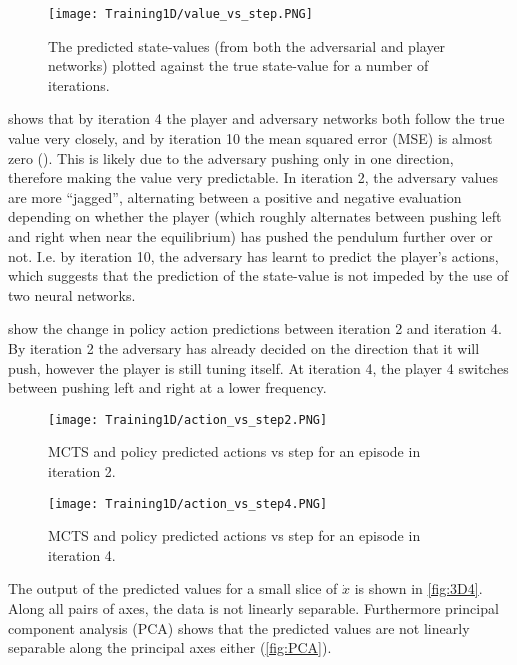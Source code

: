 \documentclass[../main.tex]{subfiles}
\begin{document}
\begin{figure}[H]
    \centering
    \texttt{[image: Training1D/value\_vs\_step.PNG]}
    \caption{The predicted state-values (from both the adversarial and player networks) plotted against the true state-value for a number of iterations.}
    \label{fig:value}
\end{figure}

 shows that by iteration 4 the player and adversary networks both follow the true value very closely, and by  iteration 10 the mean squared error (MSE) is almost zero (). This is likely due to the adversary pushing only in one direction, therefore making the value very predictable. In iteration 2, the adversary values are more ``jagged'', alternating between a positive and negative evaluation depending on whether the player (which roughly alternates between pushing left and right when near the equilibrium) has pushed the pendulum further over or not. I.e. by iteration 10, the adversary has learnt to predict the player's actions, which suggests that the prediction of the state-value is not impeded by the use of two neural networks.

 show the change in policy action predictions between iteration 2 and iteration 4. By iteration 2 the adversary has already decided on the direction that it will push, however the player is still tuning itself. At iteration 4, the player 4 switches between pushing left and right at a lower frequency.

\begin{figure}[h]
    \centering
    \texttt{[image: Training1D/action\_vs\_step2.PNG]}
    \caption{MCTS and policy predicted actions vs step for an episode in iteration 2.}
    \label{fig:action2}
\end{figure}
\begin{figure}[h]
    \centering
    \texttt{[image: Training1D/action\_vs\_step4.PNG]}
    \caption{MCTS and policy predicted actions vs step for an episode in iteration 4.}
    \label{fig:action4}
\end{figure}

The output of the predicted values for a small slice of $\dot{x}$ is shown in \cref{fig:3D4}. Along all pairs of axes, the data is not linearly separable. Furthermore principal component analysis (PCA) shows that the predicted values are not linearly separable along the principal axes either (\cref{fig:PCA}).
\end{document}
